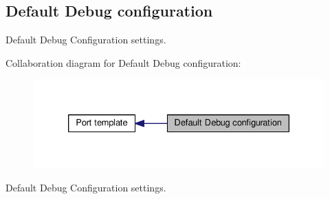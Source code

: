 \hypertarget{group__template__dbg__cfg}{\subsection{Default Debug configuration}
\label{group__template__dbg__cfg}
}


Default Debug Configuration settings.  


Collaboration diagram for Default Debug configuration\-:\nopagebreak
\begin{figure}[H]
\begin{center}
\leavevmode
\includegraphics[width=330pt]{group__template__dbg__cfg}
\end{center}
\end{figure}
Default Debug Configuration settings. 